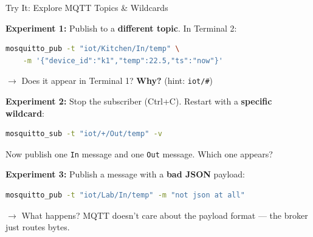 \documentclass[aspectratio=169,11pt]{beamer}
\begin{document}
\begin{frame}[fragile]{ Try It: Explore MQTT Topics \& Wildcards}

    \vspace{0.2cm}
    \textbf{Experiment 1:} Publish to a \textbf{different topic}. In Terminal 2:
\begin{lstlisting}[language=bash]
mosquitto_pub -t "iot/Kitchen/In/temp" \
    -m '{"device_id":"k1","temp":22.5,"ts":"now"}'
\end{lstlisting}
    {\small $\rightarrow$ Does it appear in Terminal 1? \textbf{Why?} (hint: \texttt{iot/\#})}

    \vspace{0.15cm}
    \textbf{Experiment 2:} Stop the subscriber (Ctrl+C). Restart with a \textbf{specific wildcard}:
\begin{lstlisting}[language=bash]
mosquitto_sub -t "iot/+/Out/temp" -v
\end{lstlisting}
    Now publish one \texttt{In} message and one \texttt{Out} message. Which one appears?

    \vspace{0.15cm}
    \textbf{Experiment 3:} Publish a message with a \textbf{bad JSON} payload:
\begin{lstlisting}[language=bash]
mosquitto_pub -t "iot/Lab/In/temp" -m "not json at all"
\end{lstlisting}
    {\small $\rightarrow$ What happens? MQTT doesn't care about the payload format --- the broker just routes bytes.}
\end{frame}
\end{document}
